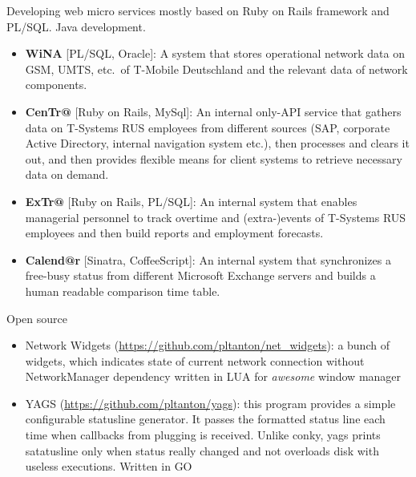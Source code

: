 \documentclass{cv}
\begin{document}
\begin{cvblock}{%
		}

	Developing web micro services mostly based on Ruby on Rails framework and PL/SQL\@.
	Java development.

	\begin{itemize}
		\item \textbf{WiNA} [PL/SQL, Oracle]:
		      A system that stores operational network data on GSM,
		      UMTS, etc.\ of T-Mobile Deutschland and the relevant data of
		      network components.

		\item \textbf{CenTr@} [Ruby on Rails, MySql]:
		      An internal only-API service that gathers data on T-Systems RUS employees
		      from different sources (SAP, corporate Active Directory,
		      internal navigation system etc.), then processes and clears it out, and
		      then provides flexible means for client systems to retrieve necessary
		      data on demand.

		\item \textbf{ExTr@} [Ruby on Rails, PL/SQL]:
		      An internal system that enables managerial personnel to track overtime
		      and (extra-)events of T-Systems RUS employees and then build reports and
		      employment forecasts.

		\item \textbf{Calend@r} [Sinatra, CoffeeScript]:
		      An internal system that synchronizes a free-busy status from different
		      Microsoft Exchange servers and builds a human readable comparison time
		      table.
	\end{itemize}
\end{cvblock}

\begin{cvblock}{Open source}
	\begin{itemize}
		\item Network Widgets
		      (\url{https://github.com/pltanton/net_widgets}):
		      a bunch of widgets, which indicates state of current network connection
		      without NetworkManager dependency written in LUA for
		      \textit{awesome} window manager
		\item YAGS
		      (\url{https://github.com/pltanton/yags}):
		      this program provides a simple configurable statusline generator. It
		      passes the formatted status line each time when callbacks from plugging
		      is received. Unlike conky, yags prints satatusline only when status
		      really changed and not overloads disk with useless executions. Written in
		      GO

	\end{itemize}
\end{cvblock}
\end{document}
